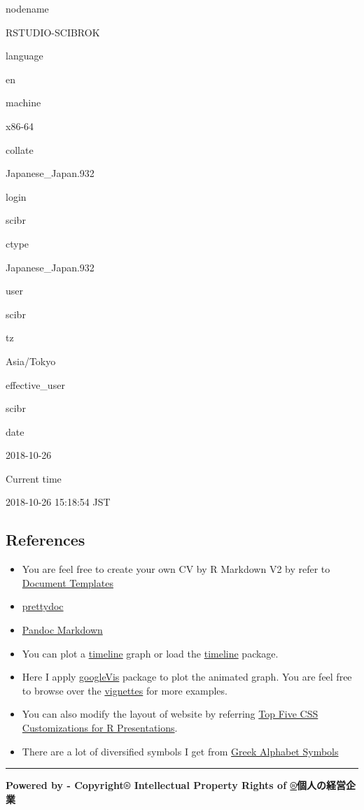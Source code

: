 \documentclass[]{article}
\providecommand{\tightlist}{%
  \setlength{\itemsep}{0pt}\setlength{\parskip}{0pt}}
\begin{document}
nodename

RSTUDIO-SCIBROK

language

en

machine

x86-64

collate

Japanese\_Japan.932

login

scibr

ctype

Japanese\_Japan.932

user

scibr

tz

Asia/Tokyo

effective\_user

scibr

date

2018-10-26

Current time

2018-10-26 15:18:54 JST

\subsection{References}\label{references}

\begin{itemize}
\tightlist
\item
  You are feel free to create your own CV by R Markdown V2 by refer to
  \href{http://rmarkdown.rstudio.com/developer_document_templates.html?version=0.99.484\&mode=server}{Document
  Templates}
\item
  \href{http://yixuan.cos.name/prettydoc/}{prettydoc}
\item
  \href{http://rmarkdown.rstudio.com/authoring_pandoc_markdown.html}{Pandoc
  Markdown}
\item
  You can plot a
  \href{http://stackoverflow.com/questions/20695311/chronological-timeline-with-points-in-time-and-format-date}{timeline}
  graph or load the \href{http://jason.bryer.org/timeline/}{timeline}
  package.
\item
  Here I apply
  \href{https://cran.r-project.org/web/packages/googleVis/vignettes/Using_googleVis_with_knitr.html}{googleVis}
  package to plot the animated graph. You are feel free to browse over
  the
  \href{https://cran.r-project.org/web/packages/googleVis/vignettes/googleVis.pdf}{vignettes}
  for more examples.
\item
  You can also modify the layout of website by referring
  \href{http://rstudio-pubs-static.s3.amazonaws.com/27777_55697c3a476640caa0ad2099fe914ae5.html\#/}{Top
  Five CSS Customizations for R Presentations}.
\item
  There are a lot of diversified symbols I get from
  \href{http://www.rapidtables.com/math/symbols/greek_alphabet.htm}{Greek
  Alphabet Symbols}
\end{itemize}

\begin{center}\rule{0.5\linewidth}{\linethickness}\end{center}

{\textbf{Powered by - Copyright® Intellectual Property Rights of
\href{http://www.scibrokes.com}{®}個人の経営企業}}
\end{document}
